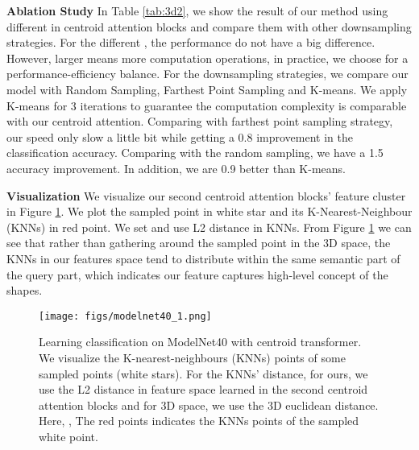 \documentclass[english]{article}
\begin{document}
\textbf{Ablation Study} \space In Table \ref{tab:3d2}, we show the result of our method using different  in centroid attention blocks and compare them with other downsampling strategies. For the different , the performance do not have a big difference. However, larger  means more computation operations, in practice, we choose  for a performance-efficiency balance. For the downsampling strategies, we compare our model with Random Sampling, Farthest Point Sampling and K-means. We apply K-means for 3 iterations to guarantee the computation complexity is comparable with our centroid attention. Comparing with farthest point sampling strategy, our speed only slow a little bit while getting a 0.8 improvement in the classification accuracy. Comparing with the random sampling, we have a 1.5 accuracy improvement. In addition, we are 0.9 better than K-means.


\textbf{Visualization} \space We visualize our second centroid attention blocks' feature cluster in Figure \ref{fig:modelnet40_vis}. We plot the sampled point in white star and its K-Nearest-Neighbour (KNNs) in red point. We set  and use L2 distance in KNNs. From Figure \ref{fig:modelnet40_vis}
 we can see that rather than gathering around the sampled point in the 3D space, the KNNs in our features space tend to distribute within the same semantic part of the query part, which indicates our feature captures high-level concept of the shapes.


\begin{figure}[ht]
    \centering
    \texttt{[image: figs/modelnet40\_1.png]}
    \caption{Learning classification on ModelNet40 with  centroid transformer. We
    visualize the K-nearest-neighbours (KNNs) points of some sampled points (white stars). 
    For the KNNs' distance, for ours, we use the L2 distance in feature space learned in the second centroid attention blocks and for 3D space, we use the 3D euclidean distance. Here, , The red points indicates the KNNs points of the sampled white point. }
    \label{fig:modelnet40_vis}
    \vspace{-1em}
\end{figure}
\end{document}
